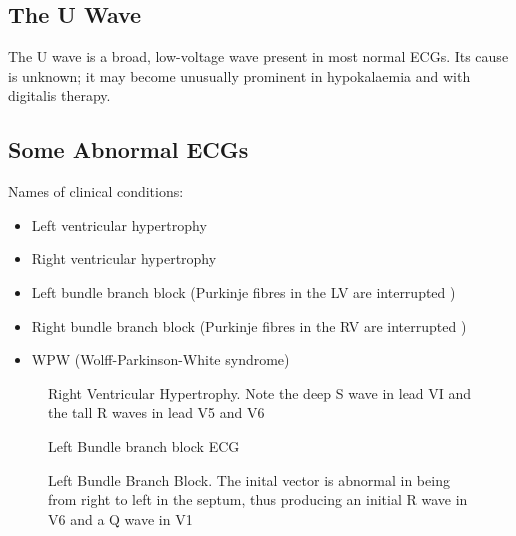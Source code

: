 \subsection{The U Wave}
The U wave is a broad, low-voltage wave present in most normal ECGs. Its cause
is unknown; it may become unusually prominent in hypokalaemia and with
digitalis therapy.

\subsection{Some Abnormal ECGs} 

Names of clinical conditions:
\begin{itemize}
\item Left ventricular hypertrophy %
\item Right ventricular hypertrophy 
\item Left bundle branch block  
(Purkinje fibres in the LV are interrupted  )
\item Right bundle branch block  
(Purkinje fibres in the RV are interrupted  )
\item WPW (Wolff-Parkinson-White syndrome)
\end{itemize}

\begin{figure}[htbp] \centering
  \caption[Right Ventricular Hypertrophy]{Right Ventricular Hypertrophy.  Note
    the deep S wave in lead VI and the tall R waves in lead V5 and V6}
  \label{fig:rvhypertrophy}
\end{figure}

\begin{figure}[htbp] \centering
  \caption[Left Bundle Branch Block ECG]{Left Bundle branch block ECG}
  \label{fig:leftbbb-ecg}
\end{figure}

\begin{figure}[htbp] \centering
  \caption[Left Bundle Branch Block]{Left Bundle Branch Block.  The inital
    vector is abnormal in being from right to left in the septum, thus
    producing an initial R wave in V6 and a Q wave in V1}
  \label{fig:leftbbb}
\end{figure}

